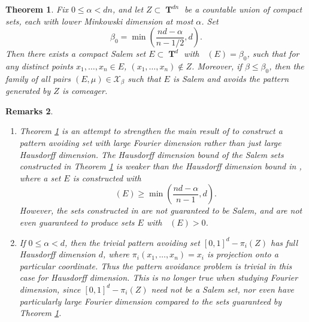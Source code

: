 \documentclass[12pt,reqno]{article}
\numberwithin{equation}{section}
\DeclareMathOperator{\hausdim}{\dim_{\mathbf{H}}}
\DeclareMathOperator{\fordim}{\dim_{\mathbf{F}}}
\DeclareMathOperator{\TT}{\mathbf{T}}
\newtheorem{theorem}{Theorem}
\newtheorem{remarks}[theorem]{Remarks}
\numberwithin{theorem}{section}
\begin{document}
\begin{theorem} \label{maintheorem}
    Fix $0 \leq \alpha < dn$, and let $Z \subset \TT^{dn}$ be a countable union of compact sets, each with lower Minkowski dimension at most $\alpha$. Set
    \[ \beta_0 = \min \left( \frac{nd - \alpha}{n-1/2}, d \right). \]
    Then there exists a compact Salem set $E \subset \TT^d$ with $\fordim(E) = \beta_0$, such that for any distinct points $x_1, \dots, x_n \in E$, $(x_1, \dots, x_n) \not \in Z$. Moreover, if $\beta \leq \beta_0$, then the family of all pairs $(E,\mu) \in \mathcal{X}_\beta$ such that $E$ is Salem and avoids the pattern generated by $Z$ is comeager.
\end{theorem}

\begin{remarks}
    \ 
    \begin{enumerate}
        \item Theorem \ref{maintheorem} is an attempt to strengthen the main result of \cite{OurPaper} to construct a pattern avoiding set with large Fourier dimension rather than just large Hausdorff dimension. The Hausdorff dimension bound of the Salem sets constructed in Theorem \ref{maintheorem} is weaker than the Hausdorff dimension bound in \cite{OurPaper}, where a set $E$ is constructed with
        \[ \hausdim(E) \geq \min \left( \frac{nd - \alpha}{n - 1}, d \right). \]
        However, the sets constructed in \cite{OurPaper} are not guaranteed to be Salem, and are not even guaranteed to produce sets $E$ with $\fordim(E) > 0$.

        \item If $0 \leq \alpha < d$, then the trivial pattern avoiding set $[0,1]^d - \pi_i(Z)$ has full Hausdorff dimension $d$, where $\pi_i(x_1,\dots,x_n) = x_i$ is projection onto a particular coordinate. Thus the pattern avoidance problem is trivial in this case for Hausdorff dimension. This is no longer true when studying Fourier dimension, since $[0,1]^d - \pi_i(Z)$ need not be a Salem set, nor even have particularly large Fourier dimension compared to the sets guaranteed by Theorem \ref{maintheorem}.


\end{enumerate}
\end{remarks}
\end{document}
